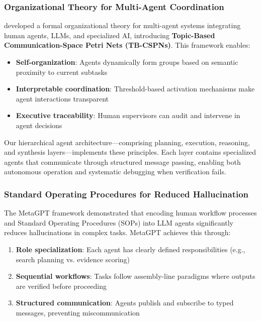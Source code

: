 \subsubsection{Organizational Theory for Multi-Agent Coordination}

\citet{smith2025organizational} developed a formal organizational theory for multi-agent systems integrating human agents, LLMs, and specialized AI, introducing \textbf{Topic-Based Communication-Space Petri Nets (TB-CSPNs)}. This framework enables:

\begin{itemize}
    \item \textbf{Self-organization}: Agents dynamically form groups based on semantic proximity to current subtasks
    \item \textbf{Interpretable coordination}: Threshold-based activation mechanisms make agent interactions transparent
    \item \textbf{Executive traceability}: Human supervisors can audit and intervene in agent decisions
\end{itemize}

Our hierarchical agent architecture—comprising planning, execution, reasoning, and synthesis layers—implements these principles. Each layer contains specialized agents that communicate through structured message passing, enabling both autonomous operation and systematic debugging when verification fails.

\subsubsection{Standard Operating Procedures for Reduced Hallucination}

The MetaGPT framework \citep{hong2024metagpt} demonstrated that encoding human workflow processes and Standard Operating Procedures (SOPs) into LLM agents significantly reduces hallucinations in complex tasks. MetaGPT achieves this through:

\begin{enumerate}
    \item \textbf{Role specialization}: Each agent has clearly defined responsibilities (e.g., search planning vs. evidence scoring)
    \item \textbf{Sequential workflows}: Tasks follow assembly-line paradigms where outputs are verified before proceeding
    \item \textbf{Structured communication}: Agents publish and subscribe to typed messages, preventing miscommunication
\end{enumerate}

